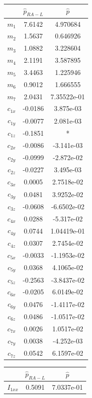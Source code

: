 \documentclass{article}
\begin{document}
\begin{table}
\begin{center}
\begin{tabular}{|c|cc|}
\hline
& $\hat{p}_{RA-L}$ & $\hat{p}$\\ 
\hline
$ m_1 $ & 7.6142 & 4.970684\\
$ m_2 $ & 1.5637 & 0.646926\\
$ m_3 $ & 1.0882 & 3.228604\\
$ m_4 $ & 2.1191 & 3.587895\\
$ m_5 $ & 3.4463 & 1.225946\\
$ m_6 $ & 0.9012 & 1.666555\\
$ m_7 $ & 2.0431 & 7.35522e-01\\
$ c_{1x} $ & -0.0186 & 3.875e-03\\
$ c_{1y} $ & -0.0077 & 2.081e-03\\
$ c_{1z} $ & -0.1851 & *\\
$ c_{2x} $ & -0.0086 & -3.141e-03\\
$ c_{2y} $ & -0.0999 & -2.872e-02\\
$ c_{2z} $ & -0.0227 & 3.495e-03\\
$ c_{3x} $ & 0.0005 & 2.7518e-02\\
$ c_{3y} $ & 0.0481 & 3.9252e-02\\
$ c_{3z} $ & -0.0608 & -6.6502e-02\\
$ c_{4x} $ & 0.0288 & -5.317e-02\\
$ c_{4y} $ & 0.0744 & 1.04419e-01\\
$ c_{4z} $ & 0.0307 & 2.7454e-02\\
$ c_{5x} $ & -0.0033 & -1.1953e-02\\
$ c_{5y} $ & 0.0368 & 4.1065e-02\\
$ c_{5z} $ & -0.2563 & -3.8437e-02\\
$ c_{6x} $ & -0.0205 & 6.0149e-02\\
$ c_{6y} $ & 0.0476 & -1.4117e-02\\
$ c_{6z} $ & 0.0486 & -1.0517e-02\\
$ c_{7x} $ & 0.0026 & 1.0517e-02\\
$ c_{7y} $ & 0.0038 & -4.252e-03\\
$ c_{7z} $ & 0.0542 & 6.1597e-02\\
\hline
\end{tabular}
\hspace{1cm}
\begin{tabular}{|c|cc|}
\hline
& $\hat{p}_{RA-L}$ & $\hat{p}$\\ 
\hline
$ I_{1xx} $ & 0.5091 & 7.0337e-01\\

\end{tabular}
\end{center}
\end{table}
\end{document}
